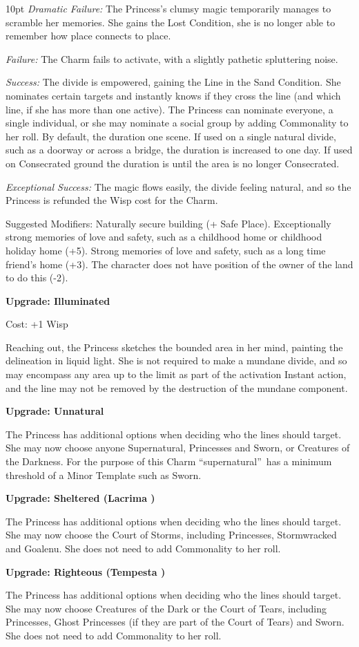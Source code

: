 \begin{myindentpar}{10pt}    \emph{Dramatic Failure:} The Princess's clumsy magic temporarily manages to scramble her memories. She gains the Lost Condition, she is no longer able to remember how place connects to place. 

    \emph{Failure:} The Charm fails to activate, with a slightly pathetic spluttering noise.

    \emph{Success:} The divide is empowered, gaining the Line in the Sand Condition. She nominates certain targets and instantly knows if they cross the line (and which line, if she has more than one active). The Princess can nominate everyone, a single individual, or she may nominate a social group by adding Commonality to her roll. By default, the duration one scene. If used on a single natural divide, such as a doorway or across a bridge, the duration is increased to one day. If used on Consecrated ground the duration is until the area is no longer Consecrated.

    \emph{Exceptional Success:} The magic flows easily, the divide feeling natural, and so the Princess is refunded the Wisp cost for the Charm.

    Suggested Modifiers: Naturally secure building (+ Safe Place). Exceptionally strong memories of love and safety, such as a childhood home or childhood holiday home (+5). Strong memories of love and safety, such as a long time friend's home (+3). The character does not have position of the owner of the land to do this (-2).

\textbf{Upgrade: Illuminated}

\noindent Cost: +1 Wisp

Reaching out, the Princess sketches the bounded area in her mind, painting the delineation in liquid light. She is not required to make a mundane divide, and so may encompass any area up to the limit as part of the activation Instant action, and the line may not be removed by the destruction of the mundane component. 

\textbf{Upgrade: Unnatural}

The Princess has additional options when deciding who the lines should target. She may now choose anyone Supernatural, Princesses and Sworn, or Creatures of the Darkness. For the purpose of this Charm \textquotedblleft supernatural\textquotedblright\, has a minimum threshold of a Minor Template such as Sworn.

\textbf{Upgrade: Sheltered (Lacrima \textbullet)}

The Princess has additional options when deciding who the lines should target. She may now choose the Court of Storms, including Princesses, Stormwracked and Goalenu. She does not need to add Commonality to her roll. 

\textbf{Upgrade: Righteous (Tempesta \textbullet)}

The Princess has additional options when deciding who the lines should target. She may now choose Creatures of the Dark or the Court of Tears, including Princesses, Ghost Princesses (if they are part of the Court of Tears) and Sworn. She does not need to add Commonality to her roll. 

\end{myindentpar}

